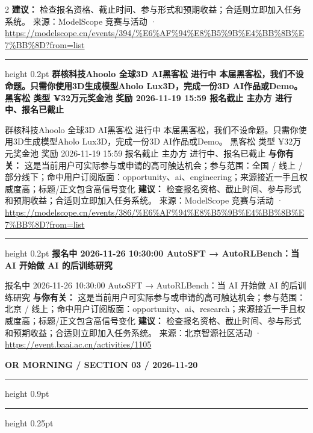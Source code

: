 \documentclass[10.5pt]{ctexart}
\begin{document}
\begin{multicols}{2}
\textbf{建议：} 检查报名资格、截止时间、参与形式和预期收益；合适则立即加入任务系统。
{\footnotesize\color{ormuted} 来源：ModelScope 竞赛与活动 · \url{https://modelscope.cn/events/394/%E6%AF%94%E8%B5%9B%E4%BB%8B%E7%BB%8D?from=list}}
\vspace{2mm}
\hrule height 0.2pt
\vspace{2mm}
{\large\bfseries 群核科技Ahoolo 全球3D AI黑客松 进行中 本届黑客松，我们不设命题。只需你使用3D生成模型Aholo Lux3D，完成一份3D AI作品或Demo。 黑客松 类型 ¥32万元奖金池 奖励 2026-11-19 15:59 报名截止 主办方 进行中、报名已截止}\par
群核科技Ahoolo 全球3D AI黑客松 进行中 本届黑客松，我们不设命题。只需你使用3D生成模型Aholo Lux3D，完成一份3D AI作品或Demo。 黑客松 类型 ¥32万元奖金池 奖励 2026-11-19 15:59 报名截止 主办方 进行中、报名已截止
\textbf{与你有关：} 这是当前用户可实际参与或申请的高可触达机会；参与范围：全国 / 线上 / 部分线下；命中用户订阅版面：opportunity、ai、engineering；来源接近一手且权威度高；标题/正文包含高信号变化
\textbf{建议：} 检查报名资格、截止时间、参与形式和预期收益；合适则立即加入任务系统。
{\footnotesize\color{ormuted} 来源：ModelScope 竞赛与活动 · \url{https://modelscope.cn/events/386/%E6%AF%94%E8%B5%9B%E4%BB%8B%E7%BB%8D?from=list}}
\vspace{2mm}
\hrule height 0.2pt
\vspace{2mm}
{\large\bfseries 报名中 2026-11-26 10:30:00 AutoSFT → AutoRLBench：当 AI 开始做 AI 的后训练研究}\par
报名中 2026-11-26 10:30:00 AutoSFT → AutoRLBench：当 AI 开始做 AI 的后训练研究
\textbf{与你有关：} 这是当前用户可实际参与或申请的高可触达机会；参与范围：北京 / 线上；命中用户订阅版面：opportunity、ai、research；来源接近一手且权威度高；标题/正文包含高信号变化
\textbf{建议：} 检查报名资格、截止时间、参与形式和预期收益；合适则立即加入任务系统。
{\footnotesize\color{ormuted} 来源：北京智源社区活动 · \url{https://event.baai.ac.cn/activities/1105}}
\end{multicols}
\newpage
{\small\bfseries OR MORNING / SECTION 03 / 2026-11-20}
\vspace{2mm}
\hrule height 0.9pt
\vspace{1.5mm}
\hrule height 0.25pt
\vspace{4mm}
\end{document}
